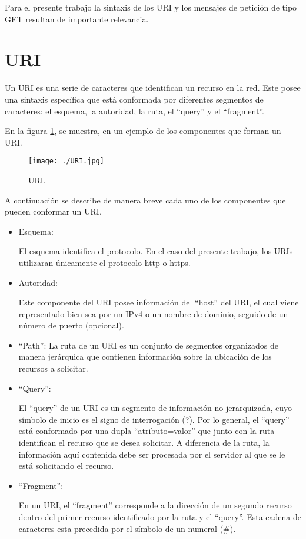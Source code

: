 Para el presente trabajo la sintaxis de los URI y los mensajes de petición de tipo GET resultan de importante relevancia.

\section{URI} \label{URIsection}

Un URI es una serie de caracteres que identifican un recurso en la red. Este posee una sintaxis específica que está conformada por diferentes segmentos de caracteres: el esquema, la autoridad, la ruta, el ``query'' y el ``fragment''.

En la figura \ref{fig:URI}, se muestra, en un ejemplo de los componentes que forman un URI.

\begin{figure}[tb]
\begin{center}
\texttt{[image: ./URI.jpg]}
\caption{URI.}
\label{fig:URI}
\end{center}
\end{figure}

A continuaci\'on se describe de manera breve cada uno de los componentes que pueden conformar un URI.

\begin{itemize}

\item Esquema:

El esquema identifica el protocolo. En el caso del presente trabajo, los URIs utilizaran únicamente el protocolo http o https.


\item Autoridad:

Este componente del URI posee información del ``host'' del URI, el cual viene representado bien sea por un IPv4 o un nombre de dominio, seguido de un número de puerto (opcional).
   
\item ``Path'':
La ruta de un URI es un conjunto de segmentos organizados de manera jerárquica que contienen información sobre la ubicación de los recursos a solicitar.

\item ``Query'':

El ``query'' de un URI es un segmento de información no jerarquizada, cuyo símbolo de inicio es el signo de interrogación (?). Por lo general, el ``query'' está conformado por una dupla ``atributo=valor'' que junto con la ruta identifican el recurso que se desea solicitar. A diferencia de la ruta, la información aquí contenida debe ser procesada por el servidor al que se le está solicitando el recurso. 

\item ``Fragment'':

En un URI, el ``fragment'' corresponde a la dirección de un segundo recurso dentro del primer recurso identificado por la ruta y el ``query''. Esta cadena de caracteres esta precedida por el símbolo de un numeral (\#).

\end{itemize}

